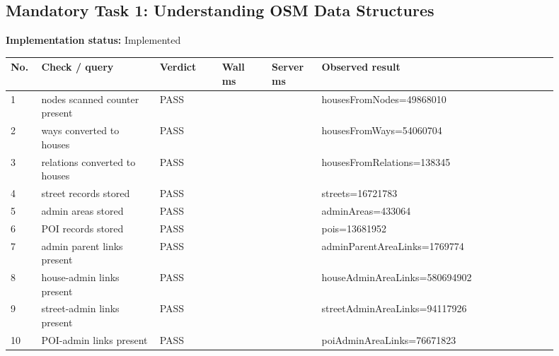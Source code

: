 \documentclass[10pt,a4paper]{article}
\begin{document}
\subsection{Mandatory Task 1: Understanding OSM Data Structures}
\textbf{Implementation status:} Implemented\\
\scriptsize
\begin{longtable}{|P{0.045\linewidth}|P{0.19\linewidth}|P{0.105\linewidth}|P{0.085\linewidth}|P{0.085\linewidth}|P{0.385\linewidth}|}
\hline
\textbf{No.} & \textbf{Check / query} & \textbf{Verdict} & \textbf{Wall ms} & \textbf{Server ms} & \textbf{Observed result}\\ \hline
{} 1 & nodes scanned counter present & PASS &  &  & housesFromNodes=49868010\\ \hline
{} 2 & ways converted to houses & PASS &  &  & housesFromWays=54060704\\ \hline
{} 3 & relations converted to houses & PASS &  &  & housesFromRelations=138345\\ \hline
{} 4 & street records stored & PASS &  &  & streets=16721783\\ \hline
{} 5 & admin areas stored & PASS &  &  & adminAreas=433064\\ \hline
{} 6 & POI records stored & PASS &  &  & pois=13681952\\ \hline
{} 7 & admin parent links present & PASS &  &  & adminParentAreaLinks=1769774\\ \hline
{} 8 & house-admin links present & PASS &  &  & houseAdminAreaLinks=580694902\\ \hline
{} 9 & street-admin links present & PASS &  &  & streetAdminAreaLinks=94117926\\ \hline
{} 10 & POI-admin links present & PASS &  &  & poiAdminAreaLinks=76671823\\ \hline
\end{longtable}
\normalsize
\end{document}
